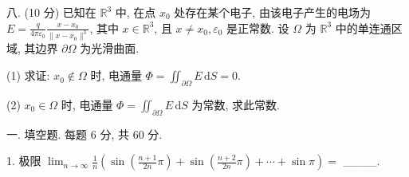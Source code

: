 \documentclass{examcollection}
\begin{document}
{\begin{minipage}{\textwidth}
八. (10 分) 已知在 $\mathbb{R}^3$ 中, 在点 $x_0$ 处存在某个电子, 由该电子产生的电场为 $E = \frac{q}{4\pi\varepsilon_0}\frac{x - x_0}{\|x - x_0\|^3}$, 其中 $x \in \mathbb{R}^3$, 且 $x \neq x_0, \varepsilon_0$ 是正常数. 设 $\Omega$ 为 $\mathbb{R}^3$ 中的单连通区域, 其边界 $\partial \Omega$ 为光滑曲面.\par
(1) 求证: $x_0 \notin \Omega$ 时, 电通量 $\Phi = \iint_{\partial \Omega} E \, \mathrm{d}S = 0$.\par
(2) $x_0 \in \Omega$ 时, 电通量 $\Phi = \iint_{\partial \Omega} E \, \mathrm{d}S$ 为常数, 求此常数.\par
{}\smallskip
一. 填空题. 每题 6 分, 共 60 分.\par
1. 极限  $\lim_{n\to\infty}\frac{1}{n}\left(\sin\left(\frac{n+1}{2n}\pi\right)+\sin\left(\frac{n+2}{2n}\pi\right)+\cdots+\sin\pi\right)=$  \_\_\_\_.\par
\end{minipage}}
\ifdim\dimexpr\ht\proofbox+\dp\proofbox\relax>\textheight
\noindent\resizebox{!}{\textheight}{\usebox{\proofbox}}\else\noindent\usebox{\proofbox}\fi\clearpage
\end{document}
